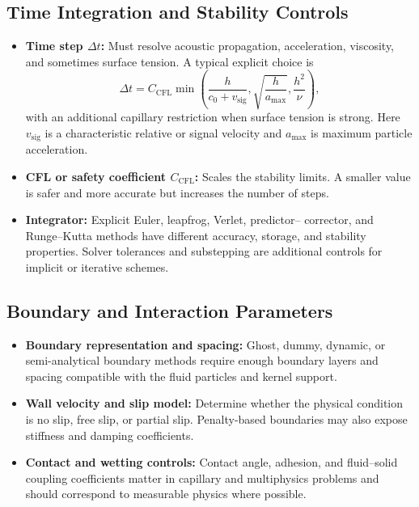 \documentclass[11pt]{article}
\begin{document}
\subsection{Time Integration and Stability Controls}

\begin{itemize}
    \item \textbf{Time step $\Delta t$:} Must resolve acoustic propagation,
    acceleration, viscosity, and sometimes surface tension. A typical explicit
    choice is
    \begin{equation}
        \Delta t
        = C_{\mathrm{CFL}}\min\left(
        \frac{h}{c_0+v_{\mathrm{sig}}},
        \sqrt{\frac{h}{a_{\max}}},
        \frac{h^2}{\nu}
        \right),
    \end{equation}
    with an additional capillary restriction when surface tension is strong.
    Here $v_{\mathrm{sig}}$ is a characteristic relative or signal velocity
    and $a_{\max}$ is maximum particle acceleration.
    \item \textbf{CFL or safety coefficient $C_{\mathrm{CFL}}$:} Scales the
    stability limits. A smaller value is safer and more accurate but increases
    the number of steps.
    \item \textbf{Integrator:} Explicit Euler, leapfrog, Verlet, predictor--
    corrector, and Runge--Kutta methods have different accuracy, storage, and
    stability properties. Solver tolerances and substepping are additional
    controls for implicit or iterative schemes.
\end{itemize}

\subsection{Boundary and Interaction Parameters}

\begin{itemize}
    \item \textbf{Boundary representation and spacing:} Ghost, dummy, dynamic,
    or semi-analytical boundary methods require enough boundary layers and
    spacing compatible with the fluid particles and kernel support.
    \item \textbf{Wall velocity and slip model:} Determine whether the physical
    condition is no slip, free slip, or partial slip. Penalty-based boundaries
    may also expose stiffness and damping coefficients.
    \item \textbf{Contact and wetting controls:} Contact angle, adhesion, and
    fluid--solid coupling coefficients matter in capillary and multiphysics
    problems and should correspond to measurable physics where possible.
\end{itemize}
\end{document}
